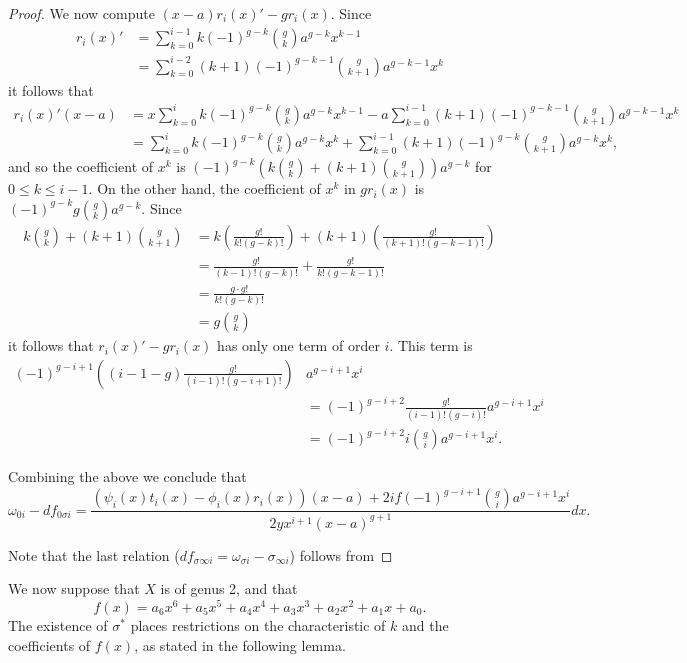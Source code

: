 \documentclass[draft, 11pt]{article} %
\theoremstyle{plain}
\theoremstyle{remark}
\begin{document}
\begin{proof}
We now compute $(x-a)r_i(x)'-gr_i(x)$.
Since 
\begin{align*}
r_i(x)' & = \sum_{k=0}^{i-1} k (-1)^{g-k} \binom{g}{k} a^{g-k} x^{k-1} \\
& = \sum_{k=0}^{i-2} (k+1) (-1)^{g-k-1} \binom{g}{k+1}a^{g-k-1} x^k
\end{align*}
it follows that
\begin{align*}
r_i(x)'(x-a) & = x \sum_{k=0}^i k (-1)^{g-k} \binom{g}{k} a^{g-k} x^{k-1} - a \sum_{k=0}^{i-1} (k+1) (-1)^{g-k-1} \binom{g}{k+1}a^{g-k-1} x^k \\
& = \sum_{k=0}^i k (-1)^{g-k} \binom{g}{k} a^{g-k} x^k  + \sum_{k=0}^{i-1} (k+1) (-1)^{g-k} \binom{g}{k+1}a^{g-k} x^k,
\end{align*}
and so the coefficient of $x^k$ is $(-1)^{g-k}\left(k\binom{g}{k} + (k+1)\binom{g}{k+1}\right) a^{g-k}$ for $0 \leq k \leq i-1$.
On the other hand, the coefficient of $x^k$ in $gr_i(x)$ is $(-1)^{g-k}g\binom{g}{k}a^{g-k}$.
Since 
\begin{align*}
k\binom{g}{k} + (k+1)\binom{g}{k+1} & = k \left( \frac{g!}{k!(g-k)!} \right) + (k+1) \left( \frac{g!}{(k+1)!(g-k-1)!} \right) \\
& = \frac{g!}{(k-1)!(g-k)!} + \frac{g!}{k!(g-k-1)!} \\
& = \frac{g\cdot g!}{k!(g-k)!} \\
& = g \binom{g}{k}
\end{align*}
it follows that $r_i(x)'-gr_i(x)$ has only one term of order $i$.
This term is
\begin{align*}
 (-1)^{g-i+1}\left( (i-1-g)\frac{g!}{(i-1)!(g-i+1)!} \right) & a^{g-i+1}x^i \\
&  = (-1)^{g-i+2} \frac{g!}{(i-1)!(g-i)!} a^{g-i+1}x^i \\
& = (-1)^{g-i+2}i\binom{g}{i} a^{g-i+1}x^i.
\end{align*}

Combining the above we conclude that
\[
\omega_{0 i } - df_{0\sigma i} =  \frac{(\psi_i(x)t_i(x) - \phi_i(x)r_i(x))(x-a) + 2if(-1)^{g-i+1}\binom{g}{i} a^{g-i+1}x^i}{2yx^{i+1}(x-a)^{g+1}}dx.
\]

Note that the last relation ($df_{\sigma \infty i} = \omega_{\sigma i} - \sigma_{\infty i}$) follows from 

\end{proof}

We now suppose that $X$ is of genus 2, and that
\[
f(x) = a_6x^6 + a_5x^5 + a_4x^4 + a_3x^3 + a_2x^2 + a_1x + a_0.
\]
The existence of $\sigma^*$ places restrictions on the characteristic of $k$ and the coefficients of $f(x)$, as stated in the following lemma.
\end{document}
